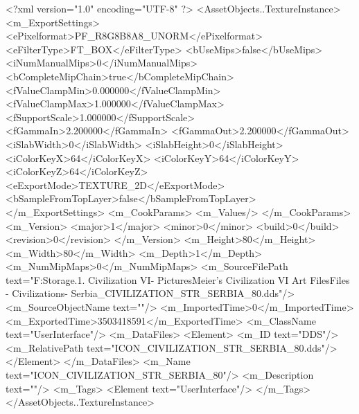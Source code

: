 <?xml version="1.0" encoding="UTF-8" ?>
<AssetObjects..TextureInstance>
	<m_ExportSettings>
		<ePixelformat>PF_R8G8B8A8_UNORM</ePixelformat>
		<eFilterType>FT_BOX</eFilterType>
		<bUseMips>false</bUseMips>
		<iNumManualMips>0</iNumManualMips>
		<bCompleteMipChain>true</bCompleteMipChain>
		<fValueClampMin>0.000000</fValueClampMin>
		<fValueClampMax>1.000000</fValueClampMax>
		<fSupportScale>1.000000</fSupportScale>
		<fGammaIn>2.200000</fGammaIn>
		<fGammaOut>2.200000</fGammaOut>
		<iSlabWidth>0</iSlabWidth>
		<iSlabHeight>0</iSlabHeight>
		<iColorKeyX>64</iColorKeyX>
		<iColorKeyY>64</iColorKeyY>
		<iColorKeyZ>64</iColorKeyZ>
		<eExportMode>TEXTURE_2D</eExportMode>
		<bSampleFromTopLayer>false</bSampleFromTopLayer>
	</m_ExportSettings>
	<m_CookParams>
		<m_Values/>
	</m_CookParams>
	<m_Version>
		<major>1</major>
		<minor>0</minor>
		<build>0</build>
		<revision>0</revision>
	</m_Version>
	<m_Height>80</m_Height>
	<m_Width>80</m_Width>
	<m_Depth>1</m_Depth>
	<m_NumMipMaps>0</m_NumMipMaps>
	<m_SourceFilePath text="F:\Mod Storage\2.1. Civilization VI\Mods\Archive - Pictures\Sid Meier's Civilization VI Art Files\Art Files - Civilizations\Civilization - Serbia\ICON_CIVILIZATION_STR_SERBIA_80.dds"/>
	<m_SourceObjectName text=""/>
	<m_ImportedTime>0</m_ImportedTime>
	<m_ExportedTime>3503418591</m_ExportedTime>
	<m_ClassName text="UserInterface"/>
	<m_DataFiles>
		<Element>
			<m_ID text="DDS"/>
			<m_RelativePath text="ICON_CIVILIZATION_STR_SERBIA_80.dds"/>
		</Element>
	</m_DataFiles>
	<m_Name text="ICON_CIVILIZATION_STR_SERBIA_80"/>
	<m_Description text=""/>
	<m_Tags>
		<Element text="UserInterface"/>
	</m_Tags>
</AssetObjects..TextureInstance>

